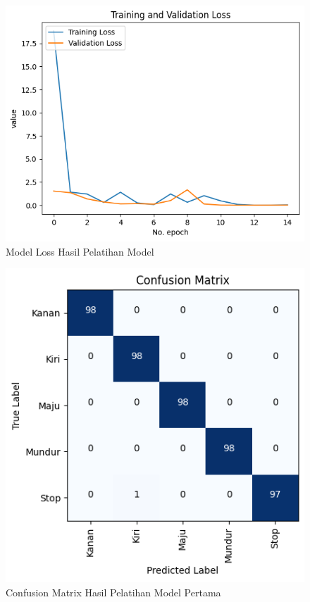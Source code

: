 \begin{figure}[H]
  \centering
  \includegraphics[scale=0.7] {gambar/normal loss.png}
  \caption{Model Loss Hasil Pelatihan Model}
  \label{fig:LossHasilPelatihanModel}
\end{figure}

\begin{figure} [H] \centering
  \includegraphics[scale=0.8]{gambar/normal confusion.png}
  \caption{Confusion Matrix Hasil Pelatihan Model Pertama}
  \label{fig:ConfusionMatrixHasilPelatihanModel}
\end{figure}

